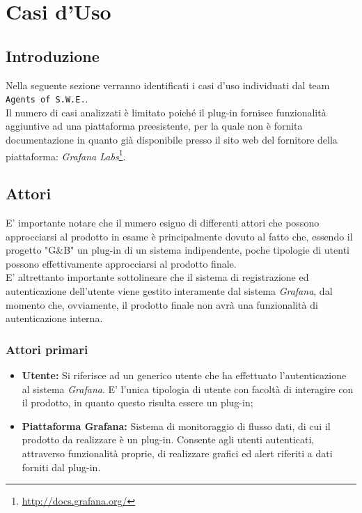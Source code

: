 \section{Casi d'Uso}\label{CasiUso}
\subsection{Introduzione}\label{CasiUso_Introduzione}
Nella seguente sezione verranno identificati i casi d'uso individuati dal team \texttt{Agents of S.W.E.}.\\
Il numero di casi analizzati è limitato poiché il plug-in fornisce funzionalità aggiuntive ad una piattaforma preesistente, per la quale non è fornita documentazione in quanto già disponibile presso il sito web del fornitore della piattaforma: \textit{Grafana Labs}\footnote{\url{http://docs.grafana.org/}}.

\subsection{Attori}\label{Attori}
E' importante notare che il numero esiguo di differenti attori che possono approcciarsi al prodotto in esame è principalmente dovuto al fatto che, essendo il progetto "G\&B" un plug-in di un sistema indipendente, poche tipologie di utenti possono effettivamente approcciarsi al prodotto finale.\\
E' altrettanto importante sottolineare che il sistema di registrazione ed autenticazione dell'utente viene gestito interamente dal sistema \textit{Grafana}, dal momento che, ovviamente, il prodotto finale non avrà una funzionalità di autenticazione interna.

\subsubsection*{Attori primari}
\begin{itemize}
\item \textbf{Utente:} Si riferisce ad un generico utente che ha effettuato l'autenticazione al sistema \textit{Grafana}. E' l'unica tipologia di utente con facoltà di interagire con il prodotto, in quanto questo risulta essere un plug-in;
\item \textbf{Piattaforma Grafana:} Sistema di monitoraggio di flusso dati, di cui il prodotto da realizzare è un plug-in. Consente agli utenti autenticati, attraverso funzionalità proprie, di realizzare grafici ed alert riferiti a dati forniti dal plug-in.
\end{itemize}

